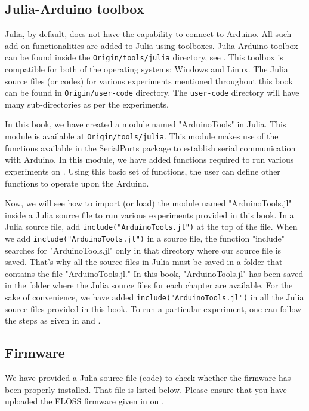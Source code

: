 \subsection{Julia-Arduino toolbox}
\label{sec:julia-toolbox}
Julia, by default, does not have the capability to connect to Arduino.
All such add-on functionalities are added to Julia using toolboxes.
Julia-Arduino toolbox can be found inside the {\tt Origin/tools/julia} directory,
see .  This toolbox is compatible for both of the operating systems: Windows and Linux.
The Julia source files (or codes) for various experiments mentioned throughout this book can be found in
      {\tt Origin/user-code} directory. The {\tt user-code} directory will have many sub-directories as per the experiments.

In this book, we have created a module named "ArduinoTools" in Julia.  This module is available at
      {\tt Origin/tools/julia}. This module makes use of the functions available in the SerialPorts package to
establish serial communication with Arduino. In this module, we have added functions required to run
various experiments on \arduino. Using this basic set of functions, the user can define other functions to operate
upon the Arduino.


Now, we will see how to import (or load) the module named "ArduinoTools.jl" inside a Julia source file to run
various experiments provided in this book. In a Julia source file, add {\tt include("ArduinoTools.jl")} at the top of the file.
When we add {\tt include("ArduinoTools.jl")} in a source file, the function "include" searches for "ArduinoTools.jl"
only in that directory where our source file is saved. That's why all the source files in Julia
must be saved in a folder that contains the file "ArduinoTools.jl." In this book, "ArduinoTools.jl" has been saved
in the folder where the Julia source files for each chapter are available. For the sake of convenience, we have
added {\tt include("ArduinoTools.jl")} in all the Julia source files provided in this book.
To run a particular experiment, one can follow the steps as given in  and .

\subsection{Firmware}
\lstset{style=mystyle}
\label{sec:test-firmware-julia}
We have provided a Julia source file (code) to check whether the firmware has been
properly installed.  That file is listed below.  Please ensure that
you have uploaded the FLOSS firmware given in  on \arduino.

